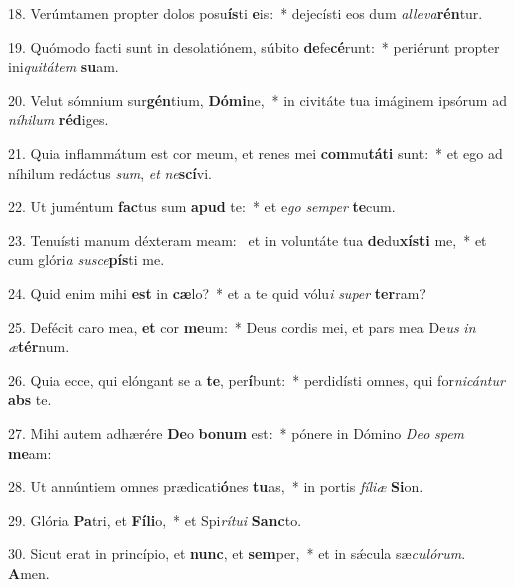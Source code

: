 18. Verúmtamen propter dolos posu\textbf{ís}ti \textbf{e}is:~*  dejecísti eos dum \textit{al}\textit{le}\textit{va}\textbf{rén}tur.\

19. Quómodo facti sunt in desolatiónem, súbito \textbf{de}fe\textbf{cé}runt:~*  periérunt propter ini\textit{qui}\textit{tá}\textit{tem} \textbf{su}am.\

20. Velut sómnium sur\textbf{gén}tium, \textbf{Dó}\textbf{mi}ne,~*  in civitáte tua imáginem ipsórum ad \textit{ní}\textit{hi}\textit{lum} \textbf{réd}iges.\

21. Quia inflammátum est cor meum, et renes mei \textbf{com}mu\textbf{tá}\textbf{ti} sunt:~*  et ego ad níhilum redáctus \textit{sum}, \textit{et} \textit{ne}\textbf{scí}vi.\

22. Ut juméntum \textbf{fac}tus sum \textbf{a}\textbf{pud} te:~*  et e\textit{go} \textit{sem}\textit{per} \textbf{te}cum.\

23. Tenuísti manum déxteram meam: \dag\  et in voluntáte tua \textbf{de}du\textbf{xís}\textbf{ti} me,~*  et cum glóri\textit{a} \textit{su}\textit{sce}\textbf{pís}ti me.\

24. Quid enim mihi \textbf{est} in \textbf{cæ}lo?~*  et a te quid vólu\textit{i} \textit{su}\textit{per} \textbf{ter}ram?\

25. Defécit caro mea, \textbf{et} cor \textbf{me}um:~*  Deus cordis mei, et pars mea De\textit{us} \textit{in} \textit{æ}\textbf{tér}num.\

26. Quia ecce, qui elóngant se a \textbf{te}, per\textbf{í}bunt:~*  perdidísti omnes, qui for\textit{ni}\textit{cán}\textit{tur} \textbf{abs} te.\

27. Mihi autem adhærére \textbf{De}o \textbf{bo}\textbf{num} est:~*  pónere in Dómino \textit{De}\textit{o} \textit{spem} \textbf{me}am:\

28. Ut annúntiem omnes prædicati\textbf{ó}nes \textbf{tu}as,~*  in portis \textit{fí}\textit{li}\textit{æ} \textbf{Si}on.\

29. Glória \textbf{Pa}tri, et \textbf{Fí}\textbf{li}o,~*  et Spi\textit{rí}\textit{tu}\textit{i} \textbf{Sanc}to.\

30. Sicut erat in princípio, et \textbf{nunc}, et \textbf{sem}per,~*  et in sǽcula sæ\textit{cu}\textit{ló}\textit{rum}. \textbf{A}men.\

